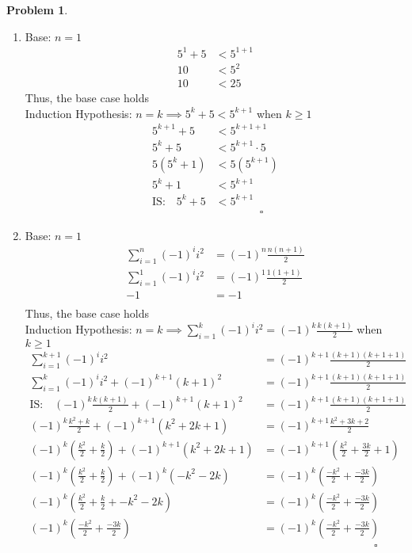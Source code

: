 \documentclass[12pt]{article}
\newtheorem{problem}{Problem}
\begin{document}
\begin{problem}\end{problem}
\begin{enumerate}
\item{
Base: $n=1$
$$\begin{aligned}
            5^1+5&<5^{1+1}\\
        	10&<5^2\\
        	10&<25
            \end{aligned}$$
Thus, the base case holds\\
Induction Hypothesis: $n=k\implies5^{k}+5<5^{k+1}$ when $k\geq1$
$$\begin{aligned}
            5^{k+1}+5&<5^{k+1+1}\\
            5^k+5&<5^{k+1}\cdot5\\
            5(5^k+1)&<5(5^{k+1})\\
            5^k+1&<5^{k+1}\\
            \text{IS:}\quad5^k+5&<5^{k+1}\\
            &\qquad\qquad\square
            \end{aligned}$$
}
\item{
Base: $n=1$
$$\begin{aligned}
            \sum_{i=1}^n(-1)^ii^2&=(-1)^n\frac{n(n+1)}{2}\\
            \sum_{i=1}^1(-1)^ii^2&=(-1)^1\frac{1(1+1)}{2}\\-1&=-1\\
            \end{aligned}$$
Thus, the base case holds\\
Induction Hypothesis: $n=k\implies\sum_{i=1}^k(-1)^ii^2=(-1)^k\frac{k(k+1)}{2}$ when $k\geq1$
$$\begin{aligned}
            \sum_{i=1}^{k+1}(-1)^ii^2&=(-1)^{k+1}\frac{(k+1)(k+1+1)}{2}\\
            \sum_{i=1}^{k}(-1)^ii^2+(-1)^{k+1}(k+1)^2&=(-1)^{k+1}\frac{(k+1)(k+1+1)}{2}\\
            \text{IS:}\quad(-1)^k\frac{k(k+1)}{2}+(-1)^{k+1}(k+1)^2&=(-1)^{k+1}\frac{(k+1)(k+1+1)}{2}\\
            (-1)^k\frac{k^2+k}{2}+(-1)^{k+1}(k^2+2k+1)&=(-1)^{k+1}\frac{k^2+3k+2}{2}\\
            (-1)^k(\frac{k^2}{2}+\frac{k}{2})+(-1)^{k+1}(k^2+2k+1)&=(-1)^{k+1}(\frac{k^2}{2}+\frac{3k}{2}+1)\\
            (-1)^k(\frac{k^2}{2}+\frac{k}{2})+(-1)^{k}(-k^2-2k)&=(-1)^{k}(\frac{-k^2}{2}+\frac{-3k}{2})\\
            (-1)^k(\frac{k^2}{2}+\frac{k}{2}+-k^2-2k)&=(-1)^{k}(\frac{-k^2}{2}+\frac{-3k}{2})\\
            (-1)^{k}(\frac{-k^2}{2}+\frac{-3k}{2})&=(-1)^{k}(\frac{-k^2}{2}+\frac{-3k}{2})\\
            &\qquad\qquad\qquad\qquad\qquad\square
            \end{aligned}$$
}
\end{enumerate}
\end{document}
